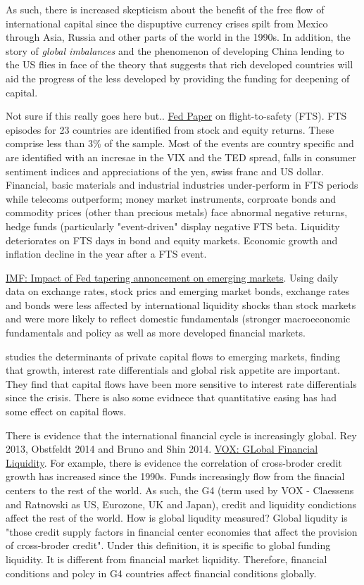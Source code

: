 \documentclass[12pt, a4paper, oneside]{article} %
\begin{document}
As such, there is increased skepticism about the benefit of the free flow of international capital since the dispuptive currency crises spilt from Mexico through Asia, Russia and other parts of the world in the 1990s.  In addition, the story of \emph{global imbalances} and the phenomenon of developing China lending to the US flies in face of the theory that suggests that rich developed countries will aid the progress of the less developed by providing the funding for deepening of capital.  

Not sure if this really goes here but..
\href{http://www.federalreserve.gov/pubs/feds/2014/201446/201446abs.html}{Fed Paper} on flight-to-safety (FTS).  FTS episodes for 23 countries are identified from stock and equity returns.  These comprise less than 3\% of the sample.  Most of the events are country specific and are identified with an incresae in the VIX and the TED spread, falls in consumer sentiment indices and appreciations of the yen, swiss franc and US dollar. Financial, basic materials and industrial industries under-perform in FTS periods while telecoms outperform; money market instruments, corproate bonds and commodity prices (other than precious metals) face abnormal negative returns, hedge funds (particularly "event-driven" display negative FTS beta.  Liquidity deteriorates on FTS days in bond and equity markets. Economic growth and inflation decline in the year after a FTS event. 

\href{http://www.imf.org/external/pubs/cat/longres.aspx?sk=41655.0}{IMF:  Impact of Fed tapering annoncement on emerging markets}.  Using daily data on exchange rates, stock prics and emerging market bonds, exchange rates and bonds were less affected by international liquidity shocks than stock markets and were more likely to reflect domestic fundamentals (stronger macroeconomic fundamentals and policy as well as more developed financial markets. 

\citet{Ahmed2014} studies the determinants of private capital flows to emerging markets, finding that growth, interest rate differentials and global risk appetite are important.  They find that capital flows have been more sensitive to interest rate differentials since the crisis. There is also some evidnece that quantitative easing has had some effect on capital flows. 

There is evidence that the international financial cycle is increasingly global.  Rey 2013, Obstfeldt 2014 and Bruno and Shin 2014.  \href{http://www.voxeu.org/article/primer-global-liquidity}{VOX: GLobal Financial Liquidity}. For example, there is evidence the correlation of cross-broder credit growth has increased since the 1990s. Funds increasingly flow from the finacial centers to the rest of the world. As such, the G4 (term used by VOX - Claessens and Ratnovski as US, Eurozone, UK and Japan), credit and liquidity condictions affect the rest of the world. How is global liqudity measured? Global liqudity is "those credit supply factors in financial center economies that affect the provision of cross-broder credit".  Under this definition, it is specific to global funding liquidity. It is different from financial market liquidity. Therefore, financial conditions and polcy in G4 countries affect financial conditions globally. 
\end{document}
